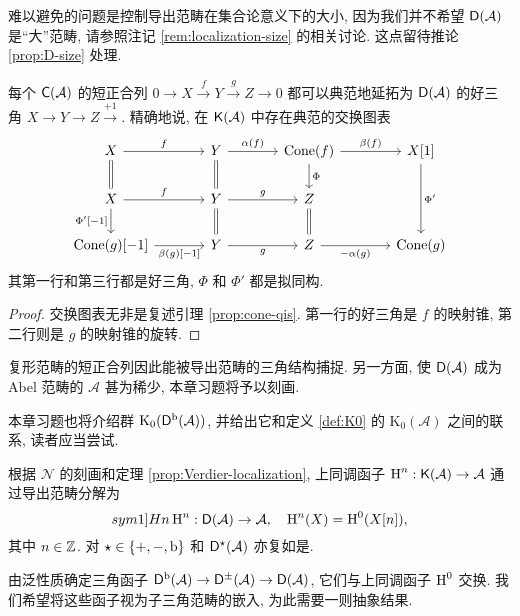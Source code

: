 难以避免的问题是控制导出范畴在集合论意义下的大小, 因为我们并不希望 $\mathsf{D}(\mathcal{A})$ 是``大''范畴, 请参照注记 \ref{rem:localization-size} 的相关讨论. 这点留待推论 \ref{prop:D-size} 处理.

\begin{proposition}\label{prop:ses-vs-triangle}
	每个 $\mathsf{C}(\mathcal{A})$ 的短正合列 $0 \to X \xrightarrow{f} Y \xrightarrow{g} Z \to 0$ 都可以典范地延拓为 $\mathsf{D}(\mathcal{A})$ 的好三角 $X \to Y \to Z \xrightarrow{+1}$. 精确地说, 在 $\mathsf{K}(\mathcal{A})$ 中存在典范的交换图表
	\[\begin{tikzcd}[column sep=large]
		X \arrow[r, "f"] \arrow[equal, d] & Y \arrow[equal, d] \arrow[r, "\alpha(f)"] & \Cone(f) \arrow[r, "\beta(f)"] \arrow[d, "\Phi"] & {X[1]} \arrow[dd, "{\Phi'}"] \\
		X \arrow[r, "f"] \arrow[d, "{\Phi'[-1]}"'] & Y \arrow[r, "g"] \arrow[equal, d] & Z \arrow[equal, d] & \\
		{\Cone(g)[-1]} \arrow[r, "{\beta(g)[-1]}"'] & Y \arrow[r, "g"'] & Z \arrow[r, "{-\alpha(g)}"'] & \Cone(g)
	\end{tikzcd}\]
	其第一行和第三行都是好三角, $\Phi$ 和 $\Phi'$ 都是拟同构.
\end{proposition}
\begin{proof}
	交换图表无非是复述引理 \ref{prop:cone-qis}. 第一行的好三角是 $f$ 的映射锥, 第二行则是 $g$ 的映射锥的旋转.
\end{proof}

复形范畴的短正合列因此能被导出范畴的三角结构捕捉. 另一方面, 使 $\mathsf{D}(\mathcal{A})$ 成为 Abel 范畴的 $\mathcal{A}$ 甚为稀少, 本章习题将予以刻画.

本章习题也将介绍群 $\mathrm{K}_0(\mathsf{D}^{\mathrm{b}}(\mathcal{A}))$, 并给出它和定义 \ref{def:K0} 的 $\mathrm{K}_0(\mathcal{A})$ 之间的联系, 读者应当尝试.

根据 $\mathcal{N}$ 的刻画和定理 \ref{prop:Verdier-localization}, 上同调函子 $\operatorname{H}^n: \mathsf{K}(\mathcal{A}) \to \mathcal{A}$ 通过导出范畴分解为
\begin{equation*}
	\index[sym1]{Hn}
	\Hm^n: \cate{D}(\mathcal{A}) \to \mathcal{A}, \quad \Hm^n(X) = \Hm^0(X[n]),
\end{equation*}
其中 $n \in \mathbb{Z}$. 对 $\star \in \{+, -, \mathrm{b}\}$ 和 $\mathsf{D}^{\star}(\mathcal{A})$ 亦复如是. 

由泛性质确定三角函子 $\mathsf{D}^{\mathrm{b}}(\mathcal{A}) \to \mathsf{D}^{\pm}(\mathcal{A}) \to \mathsf{D}(\mathcal{A})$, 它们与上同调函子 $\operatorname{H}^0$ 交换. 我们希望将这些函子视为子三角范畴的嵌入, 为此需要一则抽象结果.

